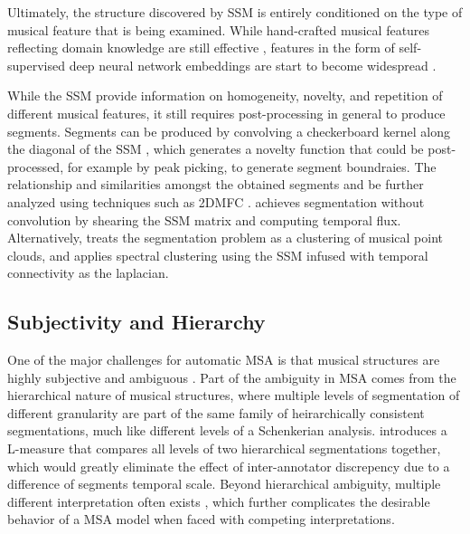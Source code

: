 Ultimately, the structure discovered by SSM is entirely conditioned on the type of musical feature that is being examined.
While hand-crafted musical features reflecting domain knowledge are still effective \citep{mcfee2014_spectral}, features in the form of self-supervised deep neural network embeddings are start to become widespread \citep{salamon2021, mccallum2019unsupervised}.

While the SSM provide information on homogeneity, novelty, and repetition of different musical features, it still requires post-processing in general to produce segments.
Segments can be produced by convolving a checkerboard kernel along the diagonal of the SSM \citep{foote2000automatic}, which generates a novelty function that could be post-processed, for example by peak picking, to generate segment boundraies.
The relationship and similarities amongst the obtained segments and be further analyzed using techniques such as 2DMFC \citep{nieto2014}.
\cite{serra2014} achieves segmentation without convolution by shearing the SSM matrix and computing temporal flux.
Alternatively, \cite{mcfee2014_spectral} treats the segmentation problem as a clustering of musical point clouds, and applies spectral clustering using the SSM infused with temporal connectivity as the laplacian.

\subsection{Subjectivity and Hierarchy}
One of the major challenges for automatic MSA is that musical structures are highly subjective and ambiguous \citep{smith2014b}.
Part of the ambiguity in MSA comes from the hierarchical nature of musical structures, where multiple levels of segmentation of different granularity are part of the same family of heirarchically consistent segmentations, much like different levels of a Schenkerian analysis.
\cite{mcfee2017evaluating} introduces a L-measure that compares all levels of two hierarchical segmentations together, which would greatly eliminate the effect of inter-annotator discrepency due to a difference of segments temporal scale.
Beyond hierarchical ambiguity, multiple different interpretation often exists \citep{wang2017, serra2014}, which further complicates the desirable behavior of a MSA model when faced with competing interpretations.

